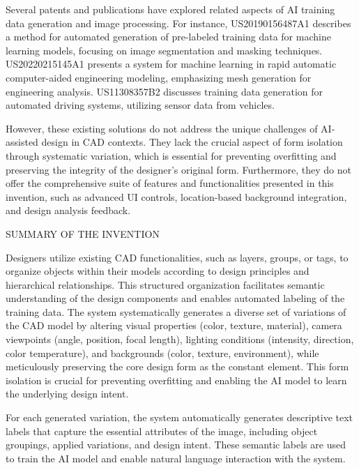 \documentclass[12pt]{report}
\begin{document}
Several patents and publications have explored related aspects of AI training data generation and image processing. For instance, US20190156487A1 describes a method for automated generation of pre-labeled training data for machine learning models, focusing on image segmentation and masking techniques. US20220215145A1 presents a system for machine learning in rapid automatic computer-aided engineering modeling, emphasizing mesh generation for engineering analysis. US11308357B2 discusses training data generation for automated driving systems, utilizing sensor data from vehicles.

However, these existing solutions do not address the unique challenges of AI-assisted design in CAD contexts. They lack the crucial aspect of form isolation through systematic variation, which is essential for preventing overfitting and preserving the integrity of the designer's original form. Furthermore, they do not offer the comprehensive suite of features and functionalities presented in this invention, such as advanced UI controls, location-based background integration, and design analysis feedback.

\begin{center}
SUMMARY OF THE INVENTION  
\end{center}

Designers utilize existing CAD functionalities, such as layers, groups, or tags, to organize objects within their models according to design principles and hierarchical relationships. This structured organization facilitates semantic understanding of the design components and enables automated labeling of the training data. The system systematically generates a diverse set of variations of the CAD model by altering visual properties (color, texture, material), camera viewpoints (angle, position, focal length), lighting conditions (intensity, direction, color temperature), and backgrounds (color, texture, environment), while meticulously preserving the core design form as the constant element. This form isolation is crucial for preventing overfitting and enabling the AI model to learn the underlying design intent.

For each generated variation, the system automatically generates descriptive text labels that capture the essential attributes of the image, including object groupings, applied variations, and design intent. These semantic labels are used to train the AI model and enable natural language interaction with the system.
\end{document}
